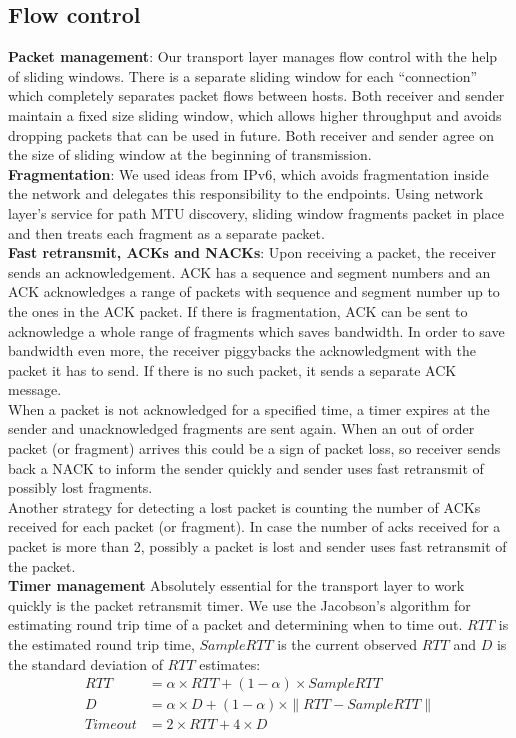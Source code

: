 \documentclass[11pt,a4paper,oneside]{report}
\begin{document}
\subsection{Flow control}
\noindent \textbf{Packet management}: Our transport layer manages flow control
with the help of sliding windows. There is a separate sliding window for each
``connection'' which completely separates packet flows between hosts. Both
receiver and sender maintain a fixed size sliding window, which allows higher
throughput and avoids dropping packets that can be used in future. Both receiver
and sender agree on the size of sliding window at the
beginning of transmission. \\
\noindent \textbf{Fragmentation}: We used ideas from IPv6, which avoids
fragmentation inside the network and delegates this responsibility to the
endpoints. Using network layer's service for path MTU discovery, sliding window
fragments packet in place and then treats each fragment as a separate packet. \\
\noindent \textbf{Fast retransmit, ACKs and NACKs}: Upon receiving a packet, the
receiver sends an acknowledgement. ACK has a sequence and segment numbers and an
ACK acknowledges a range of packets with sequence and segment number up to the
ones in the ACK packet. If there is fragmentation, ACK can be sent to
acknowledge a whole range of fragments which saves bandwidth. In order to save bandwidth
even more, the receiver piggybacks the acknowledgment with the packet it has to
send. If there is no such packet, it sends a separate ACK message. \\ When a
packet is not acknowledged for a specified time, a timer expires at the sender
and unacknowledged fragments are sent again. When an out of order packet (or
fragment) arrives this could be a sign of packet loss, so receiver sends back a
NACK to inform the sender quickly and sender uses fast retransmit of
possibly lost fragments. \\
Another strategy for detecting a lost packet is counting the number of ACKs
received for each packet (or fragment). In case the number of acks received for
a packet is more than 2, possibly a packet is lost and sender uses fast
retransmit of the packet. \\
\noindent \textbf{Timer management}
Absolutely essential for the transport layer to work quickly is the packet
retransmit timer. We use the Jacobson's algorithm for estimating round trip time
of a packet and determining when to time out. $RTT$ is the estimated round trip
time, $SampleRTT$ is the current observed $RTT$ and $D$ is the standard
deviation of $RTT$ estimates:
\begin{align}
RTT & = \alpha \times RTT + (1-\alpha) \times SampleRTT \\
D & = \alpha \times D + (1-\alpha) \times \|RTT-SampleRTT\| \\
Timeout & = 2 \times RTT+4 \times D
\end{align}
\end{document}
